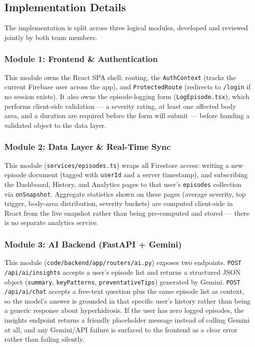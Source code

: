 \documentclass[11pt,a4paper]{article}
\begin{document}
\subsection{Implementation Details}
The implementation is split across three logical modules, developed and reviewed jointly by
both team members.

\subsubsection{Module 1: Frontend \& Authentication}
This module owns the React SPA shell: routing, the \texttt{AuthContext} (tracks the current
Firebase user across the app), and \texttt{ProtectedRoute} (redirects to \texttt{/login} if no
session exists). It also owns the episode-logging form (\texttt{LogEpisode.tsx}), which
performs client-side validation — a severity rating, at least one affected body area, and a
duration are required before the form will submit — before handing a validated object to the
data layer.

\subsubsection{Module 2: Data Layer \& Real-Time Sync}
This module (\texttt{services/episodes.ts}) wraps all Firestore access: writing a new episode
document (tagged with \texttt{userId} and a server timestamp), and subscribing the Dashboard,
History, and Analytics pages to that user's \texttt{episodes} collection via
\texttt{onSnapshot}. Aggregate statistics shown on these pages (average severity, top trigger,
body-area distribution, severity buckets) are computed client-side in React from the live
snapshot rather than being pre-computed and stored — there is no separate analytics service.

\subsubsection{Module 3: AI Backend (FastAPI + Gemini)}
This module (\texttt{code/backend/app/routers/ai.py}) exposes two endpoints. \texttt{POST
/api/ai/insights} accepts a user's episode list and returns a structured JSON object
(\texttt{summary}, \texttt{keyPatterns}, \texttt{preventativeTips}) generated by Gemini.
\texttt{POST /api/ai/chat} accepts a free-text question plus the same episode list as context,
so the model's answer is grounded in that specific user's history rather than being a generic
response about hyperhidrosis. If the user has zero logged episodes, the insights endpoint
returns a friendly placeholder message instead of calling Gemini at all, and any Gemini/API
failure is surfaced to the frontend as a clear error rather than failing silently.
\end{document}
